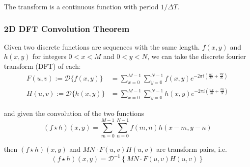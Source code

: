 The transform is a continuous function with period $1 / \Delta T$. 


\subsubsection{2D DFT Convolution Theorem}

\begin{theorem} 
Given two discrete functions are sequences with the same length.
$f(x,y)$ and $h(x,y)$ for integers $0 < x < M$ and $0 < y < N$, we can take the discrete fourier transform (DFT) of each:
\begin{align}
F(u,v) := \mathcal{D}\{f(x,y)\} &=
				\sum_{x=0}^{M-1} \sum_{y=0}^{N-1} f(x,y)
				e^{-2\pi i \left(\frac{ux}{M} + \frac{vy}{N}\right)} \\	
H(u,v) := \mathcal{D}\{h(x,y)\} &=
				\sum_{x=0}^{M-1} \sum_{y=0}^{N-1} h(x,y)
				e^{-2\pi i \left(\frac{ux}{M} + \frac{vy}{N}\right)}
\end{align}

and given the convolution of the two functions
\begin{equation}
\left(f \star h\right)(x,y) = \sum_{m=0}^{M-1} \sum_{n=0}^{N-1} f(m,n)h(x-m,y-n)
\end{equation}

then $\left(f \star h\right)(x,y)$ and $MN\cdot F(u,v)H(u,v)$ are transform pairs, i.e.
\begin{equation}
\left(f \star h\right)(x,y) = \mathcal{D}^{-1}\left\{MN\cdot F(u,v)H(u,v)\right\}
\end{equation}
\end{theorem}


